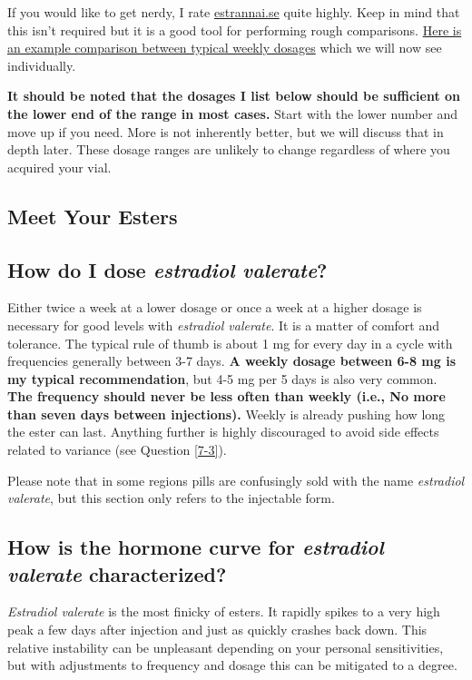 \documentclass{article}
\begin{document}
If you would like to get nerdy, I rate \href{https://estrannai.se}{estrannai.se} quite highly. Keep in mind that this isn’t required but it is a good tool for performing rough comparisons. \href{https://estrannai.se/\#i0__cu,7,7,1-cu,5,7,3-cu,5,7,2}{Here is an example comparison between typical weekly dosages} which we will now see individually.

\textbf{It should be noted that the dosages I list below should be sufficient on the lower end of the range in most cases.} Start with the lower number and move up if you need. More is not inherently better, but we will discuss that in depth later. These dosage ranges are unlikely to change regardless of where you acquired your vial.

\subsection*{Meet Your Esters}

\subsection{How do I dose \textit{estradiol valerate}?}

Either twice a week at a lower dosage or once a week at a higher dosage is necessary for good levels with \textit{estradiol valerate}. It is a matter of comfort and tolerance. The typical rule of thumb is about 1 mg for every day in a cycle with frequencies generally between 3-7 days. \textbf{A weekly dosage between 6-8 mg is my typical recommendation}, but 4-5 mg per 5 days is also very common. \textbf{The frequency should never be less often than weekly (i.e., No more than seven days between injections).} Weekly is already pushing how long the ester can last. Anything further is highly discouraged to avoid side effects related to variance (see Question \ref{7-3}).

Please note that in some regions pills are confusingly sold with the name \textit{estradiol valerate}, but this section only refers to the injectable form.

\subsection{How is the hormone curve for \textit{estradiol valerate} characterized?}

\textit{Estradiol valerate} is the most finicky of esters. It rapidly spikes to a very high peak a few days after injection and just as quickly crashes back down. This relative instability can be unpleasant depending on your personal sensitivities, but with adjustments to frequency and dosage this can be mitigated to a degree.
\end{document}
